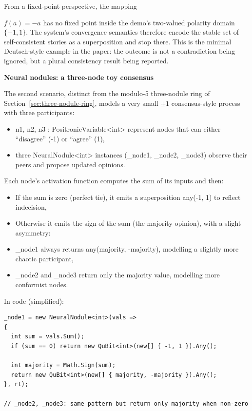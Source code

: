 \documentclass[a4paper,11pt]{article}
\begin{document}
From a fixed-point perspective, the mapping

\(f(a)=-a\) has no fixed point inside the demo's two-valued polarity domain
\(\{-1,1\}\). The system's convergence semantics therefore encode the stable
set of self-consistent stories as a superposition and stop there. This is the
minimal Deutsch-style example in the paper: the outcome is not a contradiction
being ignored, but a plural consistency result being reported.

\textbf{Neural nodules: a three-node toy consensus}

The second scenario, distinct from the modulo-5 three-nodule ring of Section~\ref{sec:three-nodule-ring}, models a very small $\pm 1$ consensus-style process with three participants:

\begin{itemize}
\item
  n1, n2, n3 : PositronicVariable\textless int\textgreater{} represent nodes that can either ``disagree'' (-1) or ``agree'' (1),
\item
  three NeuralNodule\textless int\textgreater{} instances (\_node1, \_node2, \_node3) observe their peers and propose updated opinions.
\end{itemize}

Each node's activation function computes the sum of its inputs and then:

\begin{itemize}
\item
  If the sum is zero (perfect tie), it emits a superposition any(-1, 1) to reflect indecision,
\item
  Otherwise it emits the sign of the sum (the majority opinion), with a slight asymmetry:
\item
  \_node1 always returns any(majority, -majority), modelling a slightly more chaotic participant,
\item
  \_node2 and \_node3 return only the majority value, modelling more conformist nodes.
\end{itemize}

In code (simplified):

\begin{lstlisting}[style=codeblock]
_node1 = new NeuralNodule<int>(vals =>
{
  int sum = vals.Sum();
  if (sum == 0) return new QuBit<int>(new[] { -1, 1 }).Any();

  int majority = Math.Sign(sum);
  return new QuBit<int>(new[] { majority, -majority }).Any();
}, rt);

// _node2, _node3: same pattern but return only majority when non-zero
\end{lstlisting}
\end{document}
